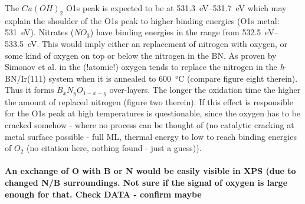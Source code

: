 The $Cu(OH)_2$ O1s peak is expected to be at \SIrange{531.3}{531.7}{\eV}\cite{deroubaix_x-ray_1992} which may explain the shoulder of the O1s peak to higher binding energies (O1s metal: \SI{531}{\eV}). Nitrates ($NO_3$) have binding energies in the range from \SIrange{532.5}{533.5}{\eV}\cite[45]{wanger_handbook_1979}. This would imply either an replacement of nitrogen with oxygen, or some kind of oxygen on top or below the nitrogen in the BN. As proven by Simonov et al. in \cite{simonov_controllable_2012} the (!atomic!) oxygen tends to replace the nitrogen in the \textit{h}-BN/Ir(111) system when it is annealed to \SI{600}{\degreeCelsius} (compare figure eight therein). Thus it forms $B_{x}N_{y}O_{1-x-y}$ over-layers. The longer the oxidation time the higher the amount of replaced nitrogen (figure two therein). If this effect is responsible for the O1s peak at high temperatures is questionable, since the oxygen has to be cracked somehow - where no process can be thought of (no catalytic cracking at metal surface possible - full ML, thermal energy to low to reach binding energies of $O_2$ (no citation here, nothing found - just a guess)).
% 
% 
\paragraph{An exchange of O with B or N would be easily visible in XPS (due to changed N/B surroundings. Not sure if the signal of oxygen is large enough for that. Check DATA - confirm maybe}